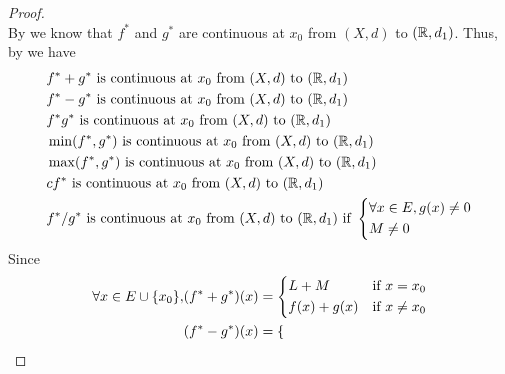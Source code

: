 \begin{proof}
\[  \]
  By  we know that \(f^*\) and \(g^*\) are continuous at \(x_0\) from \((X, d)\) to \((\mathbb{R}, d_1)\).
  Thus, by  we have
  \begin{align*}
     & f^* + g^* \text{ is continuous at } x_0 \text{ from } (X, d) \text{ to } (\mathbb{R}, d_1)                                          \\
     & f^* - g^* \text{ is continuous at } x_0 \text{ from } (X, d) \text{ to } (\mathbb{R}, d_1)                                          \\
     & f^* g^* \text{ is continuous at } x_0 \text{ from } (X, d) \text{ to } (\mathbb{R}, d_1)                                            \\
     & \min(f^*, g^*) \text{ is continuous at } x_0 \text{ from } (X, d) \text{ to } (\mathbb{R}, d_1)                                     \\
     & \max(f^*, g^*) \text{ is continuous at } x_0 \text{ from } (X, d) \text{ to } (\mathbb{R}, d_1)                                     \\
     & c f^* \text{ is continuous at } x_0 \text{ from } (X, d) \text{ to } (\mathbb{R}, d_1)                                              \\
     & f^* / g^* \text{ is continuous at } x_0 \text{ from } (X, d) \text{ to } (\mathbb{R}, d_1) \text{ if } \begin{dcases}
                                                                                                        \forall x \in E, g(x) \neq 0 \\
                                                                                                        M \neq 0
                                                                                                      \end{dcases}
  \end{align*}
  Since
  \begin{align*}
    \forall x \in E \cup \set{x_0}, & (f^* + g^*)(x) = \begin{dcases}
                                                         L + M       & \text{if } x = x_0    \\
                                                         f(x) + g(x) & \text{if } x \neq x_0
                                                       \end{dcases}                     \\
                                    & (f^* - g^*)(x) = \begin{dcases}

\end{dcases}
\end{align*}
\end{proof}
